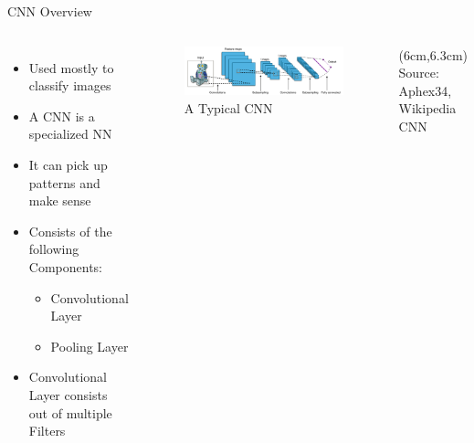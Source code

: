\documentclass[citestyle=authoryear,bibstyle=numeric,hyperref,backend=biber]{sdqbeamer}
\begin{document}
\begin{frame}{CNN Overview}
    \begin{columns}
        \begin{itemize}
            \item Used mostly to classify images
            \item A CNN is a specialized NN
            \item It can pick up patterns and make sense 
            \item Consists of the following Components:
            \begin{itemize}
                \item Convolutional Layer 
                \item Pooling Layer
            \end{itemize}
            \item Convolutional Layer consists out of multiple Filters
        \end{itemize}

        \begin{figure}
            \centering
            \includegraphics[width=1\textwidth]{pictures/typical_cnn.png}
            \caption{A Typical CNN}
            \label{fig:typical-CNN}
        \end{figure}
         \begin{textblock*}{6cm}(6cm,6.3cm) %
             \tiny{Source: Aphex34, Wikipedia CNN}
        \end{textblock*}

        
    \end{columns}
\end{frame}
\end{document}
